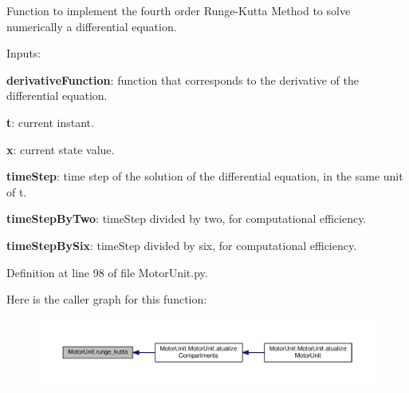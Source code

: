 Function to implement the fourth order Runge-\/\-Kutta Method to solve numerically a differential equation. 


\begin{DoxyItemize}
\item Inputs\-:
\begin{DoxyItemize}
\item {\bfseries derivative\-Function}\-: function that corresponds to the derivative of the differential equation.
\item {\bfseries t}\-: current instant.
\item {\bfseries x}\-: current state value.
\item {\bfseries time\-Step}\-: time step of the solution of the differential equation, in the same unit of t.
\item {\bfseries time\-Step\-By\-Two}\-: time\-Step divided by two, for computational efficiency.
\item {\bfseries time\-Step\-By\-Six}\-: time\-Step divided by six, for computational efficiency. 
\end{DoxyItemize}
\end{DoxyItemize}

Definition at line 98 of file Motor\-Unit.\-py.



Here is the caller graph for this function\-:
\nopagebreak
\begin{figure}[H]
\begin{center}
\leavevmode
\includegraphics[width=350pt]{namespace_motor_unit_ad34c81597ff5e9cdcf53fd13e78d2d6c_icgraph}
\end{center}
\end{figure}


